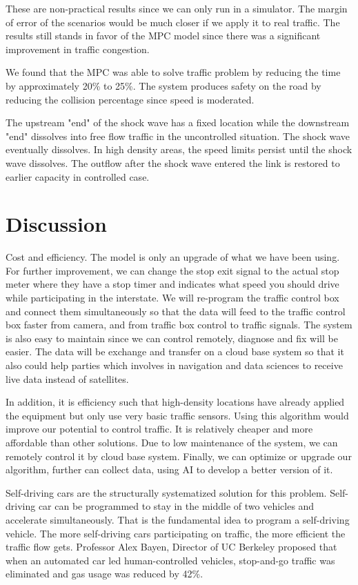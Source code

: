 \documentclass{article}
\begin{document}
These are non-practical results since we can only run in a simulator. The margin of error of the scenarios would be much closer if we apply it to real traffic. The results still stands in favor of the MPC model since there was a significant improvement in traffic congestion. 

We found that the MPC was able to solve traffic problem by reducing the time by approximately 20\% to 25\%. The system produces safety on the road by reducing the collision percentage since speed is moderated. 

The upstream "end" of the shock wave has a fixed location while the downstream "end" dissolves into free flow traffic in the uncontrolled situation. The shock wave eventually dissolves. In high density areas, the speed limits persist until the shock wave dissolves. The outflow after the shock wave entered the link is restored to earlier capacity in controlled case.



\section*{Discussion}

Cost and efficiency. The model is only an upgrade of what we have been using. For further improvement, we can change the stop exit signal to the actual stop meter where they have a stop timer and indicates what speed you should drive while participating in the interstate. We will re-program the traffic control box and connect them simultaneously so that the data will feed to the traffic control box faster from camera, and from traffic box control to traffic signals. The system is also easy to maintain since we can control remotely, diagnose and fix will be easier. The data will be exchange and transfer on a cloud base system so that it also could help parties which involves in navigation and data sciences to receive live data instead of satellites. 

In addition, it is efficiency such that high-density locations have already applied the equipment but only use very basic traffic sensors. Using this algorithm would improve our potential to control traffic. It is relatively cheaper and more affordable than other solutions. Due to low maintenance of the system, we can remotely control it by cloud base system. Finally, we can optimize or upgrade our algorithm, further can collect data, using AI to develop a better version of it.

Self-driving cars are the structurally systematized solution for this problem. Self-driving car can be programmed to stay in the middle of two vehicles and accelerate simultaneously. That is the fundamental idea to program a self-driving vehicle. The more self-driving cars participating on traffic, the more efficient the traffic flow gets. Professor Alex Bayen, Director of UC Berkeley proposed that when an automated car led human-controlled vehicles, stop-and-go traffic was eliminated and gas usage was reduced by 42\%.
\end{document}
